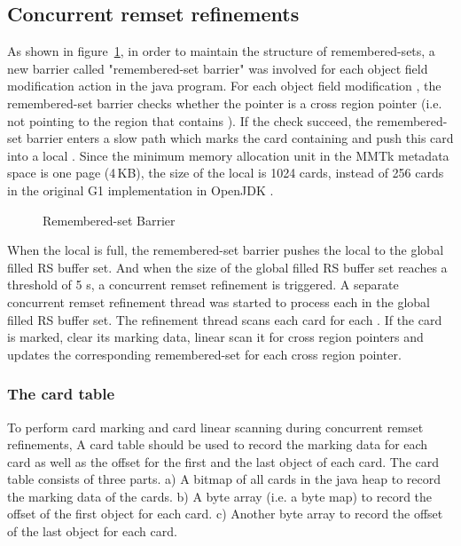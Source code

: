 \subsection{Concurrent remset refinements}

As shown in figure~\ref{fig:remsetbarrier}, in order to maintain the structure of remembered-sets,
a new barrier called "remembered-set barrier" was involved for each object field modification action in the java program.
For each object field modification , the remembered-set barrier checks
whether the pointer  is a cross region pointer (i.e. not pointing to the region that contains ).
If the check succeed, the remembered-set barrier enters a slow path which marks the
card containing  and push this card into a local .
Since the minimum memory allocation unit in the MMTk metadata space is one page (4\,KB), the size of
the local  is 1024 cards, instead of 256 cards in the original G1 implementation in OpenJDK \cite{detlefs2004garbage}.

\begin{figure}
  \centering
  
  \caption{Remembered-set Barrier}
  \label{fig:remsetbarrier}
\end{figure}

When the local  is full, the remembered-set barrier
pushes the local  to the global filled RS buffer set.
And when the size of the global filled RS buffer set reaches a threshold of 5 s,
a concurrent remset refinement is triggered.
A separate concurrent remset refinement thread was started to process each
 in the global filled RS buffer set.
The refinement thread scans each card for each .
If the card is marked, clear its marking data, linear scan it for cross region pointers
and updates the corresponding remembered-set for each cross region pointer.

\subsubsection{The card table}

To perform card marking and card linear scanning during concurrent remset refinements,
A card table should be used to record the marking data for each card as well as the offset
for the first and the last object of each card.
The card table consists of three parts. a) A bitmap of all cards in the java heap
to record the marking data of the cards. b) A byte array (i.e. a byte map) to record the
offset of the first object for each card. c) Another byte array to record the
offset of the last object for each card.

